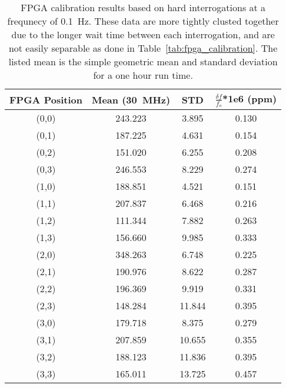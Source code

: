 \begin{table}
	\begin{center}
		\begin{tabular}{|c|c|c|c|}
			\hline
			FPGA Position & Mean (30~\unit{MHz}) & STD & $\frac{\delta f}{f_{o}}$*1e6 (ppm) \\
			\hline
			(0,0) & 243.223 & 3.895 & 0.130 \\
			\hline
			(0,1) & 187.225 & 4.631 & 0.154 \\
			\hline
			(0,2) & 151.020 & 6.255 & 0.208 \\
			\hline
			(0,3) & 246.553 & 8.229 & 0.274 \\
			\hline
			(1,0) & 188.851 & 4.521 & 0.151 \\
			\hline
			(1,1) & 207.837 & 6.468 & 0.216 \\
			\hline
			(1,2) & 111.344 & 7.882 & 0.263 \\
			\hline
			(1,3) & 156.660 & 9.985 & 0.333 \\
			\hline
			(2,0) & 348.263 & 6.748 & 0.225 \\
			\hline
			(2,1) & 190.976 & 8.622 & 0.287 \\
			\hline
			(2,2) & 196.369 & 9.919 & 0.331 \\
			\hline
			(2,3) & 148.284 & 11.844 & 0.395 \\
			\hline
			(3,0) & 179.718 & 8.375 & 0.279 \\
			\hline
			(3,1) & 207.859 & 10.655 & 0.355 \\
			\hline
			(3,2) & 188.123 & 11.836 & 0.395 \\
			\hline
			(3,3) & 165.011 & 13.725 & 0.457 \\
			\hline
		\end{tabular}
	\end{center}
	\caption{FPGA calibration results based on hard interrogations at a frequnecy of 0.1~\unit{Hz}.
	These data are more tightly clusted together due to the longer wait time between each interrogation, and are not easily separable as done in Table~\ref{tab:fpga_calibration}.
	The listed mean is the simple geometric mean and standard deviation for a one hour run time.
	}
	\label{tab:fpga_slow_calibration}
\end{table}